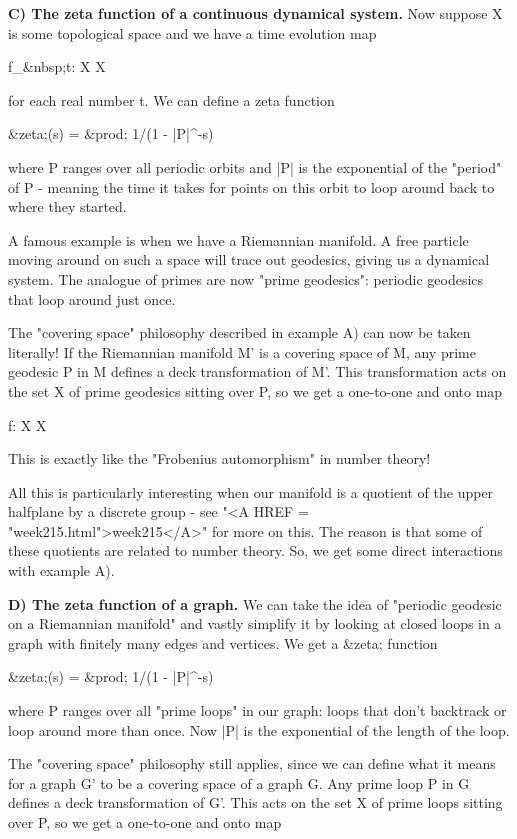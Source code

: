 \textbf{C) The zeta function of a continuous dynamical system.}  
Now suppose X is some topological space and we have a time
evolution map

f_{&nbsp;t}: X \to  X

for each real number t.  We can define a zeta function

&zeta;(s) = &prod;   1/(1 - |P|^{-s})

where P ranges over all periodic orbits and |P| is the 
exponential of the "period" of P - meaning the time it takes 
for points on this orbit to loop around back to where they started.

A famous example is when we have a Riemannian manifold.  A free particle 
moving around on such a space will trace out geodesics, giving us a 
dynamical system.  The analogue of primes are now "prime geodesics": 
periodic geodesics that loop around just once.

The "covering space" philosophy described in example A) can now be 
taken literally!  If the Riemannian manifold M' is a covering 
space of M, any prime geodesic P in M defines a deck transformation 
of M'.  This transformation acts on the set X of prime geodesics 
sitting over P, so we get a one-to-one and onto map

f: X \to  X

This is exactly like the "Frobenius automorphism" in number theory!

All this is particularly interesting when our manifold is a quotient 
of the upper halfplane by a discrete group - see "<A HREF = "week215.html">week215</A>" for more
on this.  The reason is that some of these quotients are related to 
number theory.   So, we get some direct interactions with example A).

\textbf{D) The zeta function of a graph.}  We can take the idea of
"periodic geodesic on a Riemannian manifold" and vastly simplify
it by looking at closed loops in a graph with finitely many 
edges and vertices.  We get a &zeta; function

&zeta;(s) = &prod;   1/(1 - |P|^{-s})

where P ranges over all "prime loops" in our graph: loops that don't 
backtrack or loop around more than once.  Now |P| is the exponential 
of the length of the loop.

The "covering space" philosophy still applies, since we can define 
what it means for a graph G' to be a covering space of a graph G.  
Any prime loop P in G defines a deck transformation of G'.  This 
acts on the set X of prime loops sitting over P, so we get a
one-to-one and onto map

